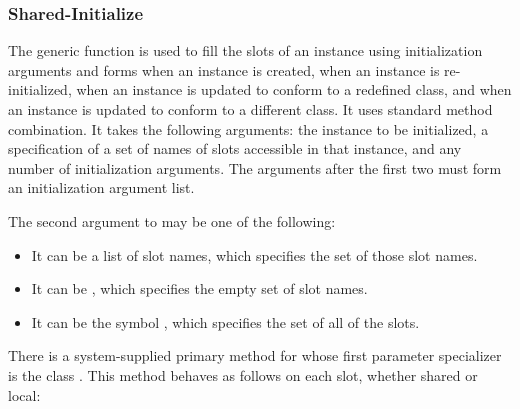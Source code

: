 \subsubsection{Shared-Initialize}
\label{Shared-Initialize-SECTION}

The generic function  is used to fill the slots
of an instance using initialization arguments and 
forms when an instance is created, when an instance is re-initialized,
when an instance is updated to conform to a redefined class, and when
an instance is updated to conform to a different class. It uses
standard method combination. It takes the following arguments: the
instance to be initialized, a specification of a set of names of slots
accessible in that instance, and any number of initialization
arguments.  The arguments after the first two must form an initialization
argument list.

The second argument to  may be one of the following:

\begin{itemize}

\item  It can be a list of slot names, which specifies
the set of those slot names. 

\item  It can be , which specifies the empty set of
slot names.

\item  It can be the symbol , which specifies the set of
all of the slots.

\end{itemize}

There is a system-supplied primary method for 
 whose first parameter specializer is the class 
.  This method behaves as follows on each slot,
whether shared or local:

